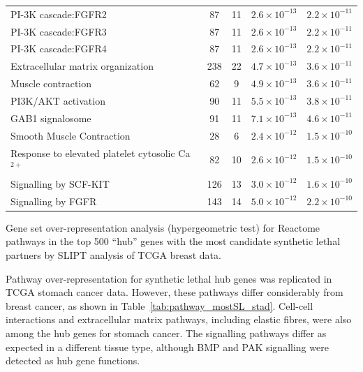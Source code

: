 \begin{table}[!ht]
{\begin{threeparttable}
\begin{tabular}{lcccc}
  \rowcolor{black!5}
  PI-3K cascade:FGFR2 &  87 &  11 & $2.6 \times 10^{-13}$ & $2.2 \times 10^{-11}$ \\ 
  \rowcolor{black!10}
  PI-3K cascade:FGFR3 &  87 &  11 & $2.6 \times 10^{-13}$ & $2.2 \times 10^{-11}$ \\ 
  \rowcolor{black!5}
  PI-3K cascade:FGFR4 &  87 &  11 & $2.6 \times 10^{-13}$ & $2.2 \times 10^{-11}$ \\ 
  \rowcolor{black!10}
  Extracellular matrix organization & 238 &  22 & $4.7 \times 10^{-13}$ & $3.6 \times 10^{-11}$ \\ 
  \rowcolor{black!5}
  Muscle contraction &  62 &   9 & $4.9 \times 10^{-13}$ & $3.6 \times 10^{-11}$ \\ 
  \rowcolor{black!10}
  PI3K/AKT activation &  90 &  11 & $5.5 \times 10^{-13}$ & $3.8 \times 10^{-11}$ \\ 
  \rowcolor{black!5}
  GAB1 signalosome &  91 &  11 & $7.1 \times 10^{-13}$ & $4.6 \times 10^{-11}$ \\ 
  \rowcolor{black!10}
  Smooth Muscle Contraction &  28 &   6 & $2.4 \times 10^{-12}$ & $1.5 \times 10^{-10}$ \\ 
  \rowcolor{black!5}
  Response to elevated platelet cytosolic Ca$^{2+}$ &  82 &  10 & $2.6 \times 10^{-12}$ & $1.5 \times 10^{-10}$ \\ 
  \rowcolor{black!10}
  Signalling by SCF-KIT & 126 &  13 & $3.0 \times 10^{-12}$ & $1.6 \times 10^{-10}$ \\ 
  \rowcolor{black!5}
  Signalling by FGFR & 143 &  14 & $5.0 \times 10^{-12}$ & $2.2 \times 10^{-10}$ \\ 
   \hline
\end{tabular}
\begin{tablenotes}
\raggedright \small
Gene set over-representation analysis (hypergeometric test) for Reactome \glspl{pathway} in the top 500 ``hub'' genes with the most candidate \gls{synthetic lethal} partners by \gls{SLIPT} analysis of \gls{TCGA} breast  data.
\end{tablenotes}
\end{threeparttable}
}
\end{table}

Pathway over-representation for \gls{synthetic lethal} hub genes was replicated in \gls{TCGA} stomach cancer  data. However, these \glspl{pathway} differ considerably from breast cancer, as shown in Table~\ref{tab:pathway_mostSL_stad}. Cell-cell interactions and extracellular matrix \glspl{pathway}, including elastic fibres, were also among the hub genes for stomach cancer. The signalling \glspl{pathway} differ as expected in a different tissue type, although BMP and PAK signalling were detected as hub gene functions.
\fi

